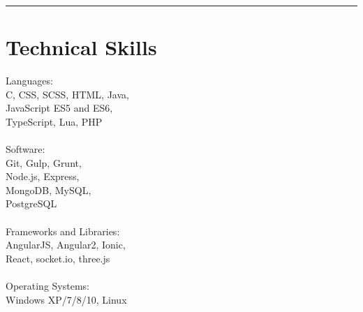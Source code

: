 \noindent\rule{0.9\hsize}{0.4pt}
\section{\normalsize{Technical Skills}}

Languages:\\
C, CSS, SCSS, HTML, Java,\\
JavaScript ES5 and ES6,\\
TypeScript, Lua, PHP\\
\\
Software:\\
Git, Gulp, Grunt,\\
Node.js, Express,\\
MongoDB, MySQL,\\
PostgreSQL\\
\\
Frameworks and Libraries:\\
AngularJS, Angular2, Ionic,\\
React, socket.io, three.js\\
\\
Operating Systems:\\
Windows XP/7/8/10, Linux\\
